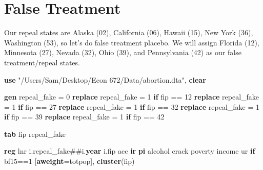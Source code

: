 \documentclass[
]{book}
\newenvironment{Shaded}{\begin{snugshade}}{\end{snugshade}}
\newcommand{\FunctionTok}[1]{\textcolor[rgb]{0.13,0.29,0.53}{\textbf{#1}}}
\newcommand{\KeywordTok}[1]{\textcolor[rgb]{0.13,0.29,0.53}{\textbf{#1}}}
\newcommand{\NormalTok}[1]{#1}
\newcommand{\StringTok}[1]{\textcolor[rgb]{0.31,0.60,0.02}{#1}}
\begin{document}
\section{False Treatment}\label{false-treatment}

Our repeal states are Alaska (02), California (06), Hawaii (15), New York (36), Washington (53), so let's do false treatment placebo. We will assign Florida (12), Minnesota (27), Nevada (32), Ohio (39), and Pennsylvania (42) as our false treatment/repeal states.

\begin{Shaded}
\begin{Highlighting}[]
\KeywordTok{use} \StringTok{"/Users/Sam/Desktop/Econ 672/Data/abortion.dta"}\NormalTok{, }\KeywordTok{clear}

\KeywordTok{gen}\NormalTok{ repeal\_fake = 0}
\KeywordTok{replace}\NormalTok{ repeal\_fake = 1 }\KeywordTok{if}\NormalTok{ fip == 12}
\KeywordTok{replace}\NormalTok{ repeal\_fake = 1 }\KeywordTok{if}\NormalTok{ fip == 27}
\KeywordTok{replace}\NormalTok{ repeal\_fake = 1 }\KeywordTok{if}\NormalTok{ fip == 32}
\KeywordTok{replace}\NormalTok{ repeal\_fake = 1 }\KeywordTok{if}\NormalTok{ fip == 39}
\KeywordTok{replace}\NormalTok{ repeal\_fake = 1 }\KeywordTok{if}\NormalTok{ fip == 42}

\KeywordTok{tab}\NormalTok{ fip repeal\_fake}

\KeywordTok{reg}\NormalTok{ lnr i.repeal\_fake\#\#i.}\FunctionTok{year}\NormalTok{ i.fip acc }\KeywordTok{ir} \KeywordTok{pi}\NormalTok{ alcohol crack poverty income ur }\KeywordTok{if}\NormalTok{ bf15==1 [}\KeywordTok{aweight}\NormalTok{=totpop], }\KeywordTok{cluster}\NormalTok{(fip)}
\end{Highlighting}
\end{Shaded}
\end{document}
